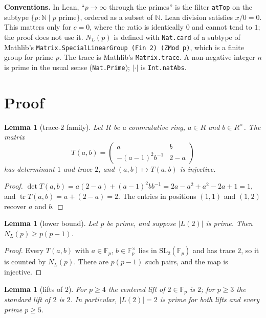 \documentclass[11pt]{article}
\newtheorem{lemma}[theorem]{Lemma}
\theoremstyle{definition}
\newcommand{\tr}{\operatorname{tr}}
\newcommand{\SL}{\mathrm{SL}}
\newcommand{\F}{\mathbb{F}}
\begin{document}
\textbf{Conventions.} In Lean, ``$p\to\infty$ through the primes'' is the filter \texttt{atTop} on
the subtype $\{p:\mathbb{N}\mid p \text{ prime}\}$, ordered as a subset of $\mathbb{N}$. Lean
division satisfies $x/0=0$. This matters only for $c=0$, where the ratio is identically $0$ and
cannot tend to $1$; the proof does not use it. $N_L(p)$ is defined with \texttt{Nat.card} of a
subtype of Mathlib's \texttt{Matrix.SpecialLinearGroup (Fin 2) (ZMod p)}, which is a finite group
for prime $p$. The trace is Mathlib's \texttt{Matrix.trace}. A non-negative integer $n$ is prime in
the usual sense (\texttt{Nat.Prime}); $|\cdot|$ is \texttt{Int.natAbs}.

\section{Proof}

\begin{lemma}[trace-$2$ family]
Let $R$ be a commutative ring, $a\in R$ and $b\in R^\times$. The matrix
\[
  T(a,b)=\begin{pmatrix} a & b\\ -(a-1)^2 b^{-1} & 2-a\end{pmatrix}
\]
has determinant $1$ and trace $2$, and $(a,b)\mapsto T(a,b)$ is injective.
\end{lemma}

\begin{proof}
$\det T(a,b)=a(2-a)+(a-1)^2bb^{-1}=2a-a^2+a^2-2a+1=1$, and $\tr T(a,b)=a+(2-a)=2$. The entries
in positions $(1,1)$ and $(1,2)$ recover $a$ and $b$.
\end{proof}

\begin{lemma}[lower bound]
Let $p$ be prime, and suppose $|L(2)|$ is prime. Then $N_L(p)\ge p(p-1)$.
\end{lemma}

\begin{proof}
Every $T(a,b)$ with $a\in\F_p$, $b\in\F_p^\times$ lies in $\SL_2(\F_p)$ and has trace $2$, so it is
counted by $N_L(p)$. There are $p(p-1)$ such pairs, and the map is injective.
\end{proof}

\begin{lemma}[lifts of $2$]
For $p\ge4$ the centered lift of $2\in\F_p$ is $2$; for $p\ge3$ the standard lift of $2$ is $2$. In
particular, $|L(2)|=2$ is prime for both lifts and every prime $p\ge5$.
\end{lemma}
\end{document}
